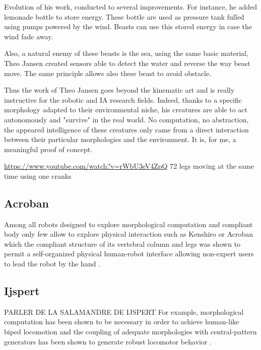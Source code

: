 Evolution of his work, conducted to several improvements. For instance, he added lemonade bottle to store energy. These bottle are used as pressure tank fulled using pumps powered by the wind. Beasts can use this stored energy in case the wind fade away.

Also, a natural enemy of these beasts is the sea, using the same basic material, Theo Jansen created sensors able to detect the water and reverse the way beast move. The same principle allows also these beast to avoid obstacle.

Thus the work of Theo Jansen goes beyond the kinematic art and is really instructive for the robotic and IA research fields. Indeed, thanks to a specific morphology adapted to their environmental niche, his creatures are able to act autonomously and "survive" in the real world. No computation, no abstraction, the appeared intelligence of these creatures only came from a direct interaction between their particular morphologies and the environment. It is, for me, a meaningful proof of concept.

\url{https://www.youtube.com/watch?v=rWbU3eV4ZpQ}
72 legs moving at the same time using one cranks

\subsection{Acroban} %
\label{sub:acroban}
Among all robots designed to explore morphological computation and compliant body only few allow to explore physical interaction such as Kenshiro \cite{Asano2012} or Acroban which the compliant structure of its vertebral column and legs was shown to permit a self-organized physical human-robot interface allowing non-expert users to lead the robot by the hand \cite{Ly2011bio}\cite{Oudeyer2011}.

\subsection{Ijspert} %
\label{sub:ijspert}

PARLER DE LA SALAMANDRE DE IJSPERT
For example, morphological computation has been shown to be necessary in order to achieve human-like biped locomotion \cite{matsushita2005locomoting} and the coupling of adequate morphologies with central-pattern generators has been shown to generate robust locomotor behavior \cite{ijspeert2007swimming}\cite{steingrube2010self}.








